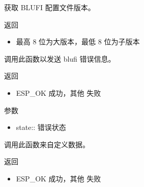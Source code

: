 \documentclass[a4paper,12pt,english]{sphinxmanual}
\begin{document}
{{\begin{sphinxVerbatim}[commandchars=\\\{\}]
\end{sphinxVerbatim}

\sphinxAtStartPar
获取 BLUFI 配置文件版本。

\sphinxAtStartPar
返回
\begin{itemize}
\item {} 
\sphinxAtStartPar
最高 8 位为大版本，最低 8 位为子版本

\end{itemize}

\begin{sphinxVerbatim}[commandchars=\\\{\}]
\end{sphinxVerbatim}

\sphinxAtStartPar
调用此函数以发送 blufi 错误信息。

\sphinxAtStartPar
返回
\begin{itemize}
\item {} 
\sphinxAtStartPar
ESP\_OK \sphinxhyphen{} 成功，其他 \sphinxhyphen{} 失败

\end{itemize}

\sphinxAtStartPar
参数
\begin{itemize}
\item {} 
\sphinxAtStartPar
state:: 错误状态

\end{itemize}

\begin{sphinxVerbatim}[commandchars=\\\{\}]
\end{sphinxVerbatim}

\sphinxAtStartPar
调用此函数来自定义数据。

\sphinxAtStartPar
返回
\begin{itemize}
\item {} 
\sphinxAtStartPar
ESP\_OK \sphinxhyphen{} 成功，其他 \sphinxhyphen{} 失败


\end{itemize}}}
\end{document}
